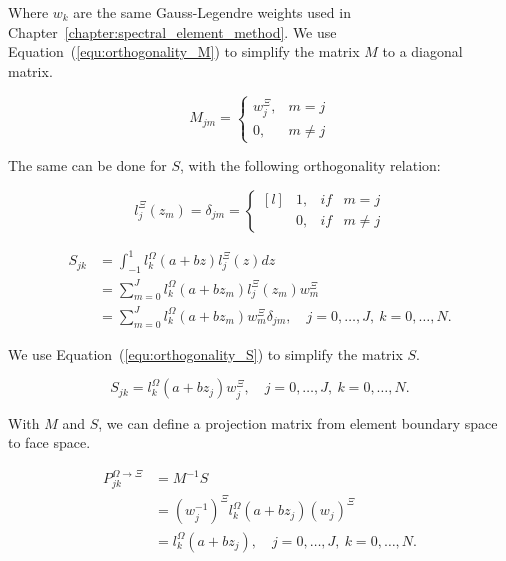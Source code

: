 Where \(w_k\) are the same Gauss-Legendre weights used in
Chapter~\ref{chapter:spectral_element_method}. We use Equation~(\ref{equ:orthogonality_M}) to
simplify the matrix \(M\) to a diagonal matrix.

\begin{equation}
	M_{jm} = \left \{ \begin{matrix}
	w_j^{\Xi }, &  m = j \\ 
	0, & m \neq  j
	\end{matrix}\right.
\end{equation}

The same can be done for \(S\), with the following orthogonality relation:

\begin{equation} \label{equ:orthogonality_S}
	l_j ^ \Xi (z_m) = \delta_{jm} = \left \{ \begin{matrix*}[l]
	& 1, & if & m = j\\ 
	& 0, & if & m \neq j
	\end{matrix*}\right.
\end{equation}

\begin{equation} \label{equ:matrix_S}
	\begin{aligned}
		S_{jk} &= \int_{-1}^{1} l_k ^ \Omega \left( a + b z \right) l_j ^ \Xi \left( z \right) dz \\
		&= \sum_{m = 0}^{J} l_k ^ \Omega \left( a + b z_m \right) l_j ^ \Xi \left( z_m \right) w_m ^ \Xi \\
		&= \sum_{m = 0}^{J} l_k ^ \Omega \left( a + b z_m \right) w_m ^{\Xi} \delta_{jm}, \quad j = 0, \ldots, J, \: k = 0, \ldots, N.
	\end{aligned}
\end{equation}

We use Equation~(\ref{equ:orthogonality_S}) to simplify the matrix \(S\).

\begin{equation}
	S_{jk} = l_k^{\Omega } \left( a + bz_j \right) w_j^{\Xi}, \quad j = 0, \ldots, J, \: k = 0, \ldots, N.
\end{equation}

With \(M\) and \(S\), we can define a projection matrix from element boundary space to face space.

\begin{equation}
	\begin{aligned}
		P_{jk} ^ {\Omega \rightarrow \Xi} &= M^{-1}S \\
		&= {\left( w_j ^{-1} \right)}^{\Xi }  l_k ^ \Omega \left( a + b z_j \right) {\left( w_j \right)}^{\Xi} \\
		&= l_k ^ \Omega \left(a + b z_j \right), \quad j = 0, \ldots, J, \: k = 0, \ldots, N.
	\end{aligned}
\end{equation}

